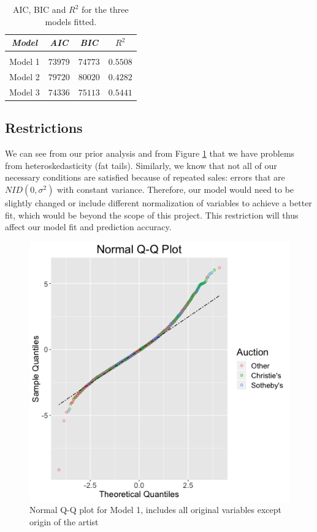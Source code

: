 \documentclass[]{asaproc}\usepackage[]{graphicx}\usepackage[]{color}
\begin{document}
\begin{table}[!ht]
\caption{\enspace AIC, BIC and $R^2$ for the three models fitted.}\label{ABR}
\begin{tabular*}{\hsize}{@{\extracolsep{\fill}}cccc}
\\[-5pt]
\multicolumn{1}{c}{\it Model} & 
\multicolumn{1}{c}{\it AIC} & 
\multicolumn{1}{c}{\it BIC} & 
\multicolumn{1}{c}{\it $R^2$}\\
\hline
\\[-5pt]
Model 1 & $73979$ & $74773$ & $0.5508$ \\ 
        Model 2 & $79720$ & $80020$ & $0.4282$ \\
        Model 3 & $74336$ & $75113$ & $0.5441$ \\
\hline
\end{tabular*}
\end{table} 

\subsection{Restrictions} 

We can see from our prior analysis and from Figure \ref{qq} that we have problems from heteroskedasticity (fat tails). Similarly, we know that not all of our necessary conditions are satisfied because of repeated sales: errors that are $NID(0,\sigma^2)$ with constant variance. Therefore, our model would need to be slightly changed or include different normalization of variables to achieve a better fit, which would be beyond the scope of this project. This restriction will thus affect our model fit and prediction accuracy.

\begin{figure}[!ht]

\includegraphics[scale = 0.5]{qq}
\caption{Normal Q-Q plot for Model 1, includes all original variables except origin of the artist}
\label{qq}
\end{figure}
\end{document}
